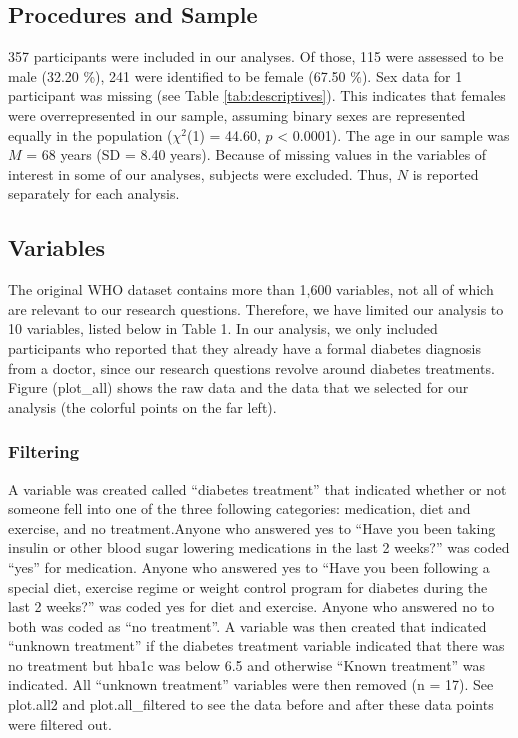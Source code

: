 \documentclass[
  man]{apa6}
\begin{document}
\hypertarget{procedures-and-sample}{%
\subsection{Procedures and Sample}\label{procedures-and-sample}}

357 participants were included in our analyses. Of those, 115 were assessed to be male (32.20 \%), 241 were identified to be female (67.50 \%). Sex data for 1 participant was missing (see Table \ref{tab:descriptives}). This indicates that females were overrepresented in our sample, assuming binary sexes are represented equally in the population (\(\chi^2\)(1) = 44.60, \(p\) \textless{} 0.0001). The age in our sample was \(M\) = 68 years (SD = 8.40 years).
Because of missing values in the variables of interest in some of our analyses, subjects were excluded. Thus, \(N\) is reported separately for each analysis.

\hypertarget{variables}{%
\subsection{Variables}\label{variables}}

The original WHO dataset contains more than 1,600 variables, not all of which are relevant to our research questions. Therefore, we have limited our analysis to 10 variables, listed below in Table 1. In our analysis, we only included participants who reported that they already have a formal diabetes diagnosis from a doctor, since our research questions revolve around diabetes treatments. Figure (plot\_all) shows the raw data and the data that we selected for our analysis (the colorful points on the far left).

\hypertarget{filtering}{%
\subsubsection{Filtering}\label{filtering}}

A variable was created called ``diabetes treatment'' that indicated whether or not someone fell into one of the three following categories: medication, diet and exercise, and no treatment.Anyone who answered yes to ``Have you been taking insulin or other blood sugar lowering medications in the last 2 weeks?'' was coded ``yes'' for medication. Anyone who answered yes to ``Have you been following a special diet, exercise regime or weight control program for diabetes during the last 2 weeks?'' was coded yes for diet and exercise. Anyone who answered no to both was coded as ``no treatment''. A variable was then created that indicated ``unknown treatment'' if the diabetes treatment variable indicated that there was no treatment but hba1c was below 6.5 and otherwise ``Known treatment'' was indicated. All ``unknown treatment'' variables were then removed (n = 17). See plot.all2 and plot.all\_filtered to see the data before and after these data points were filtered out.
\end{document}

